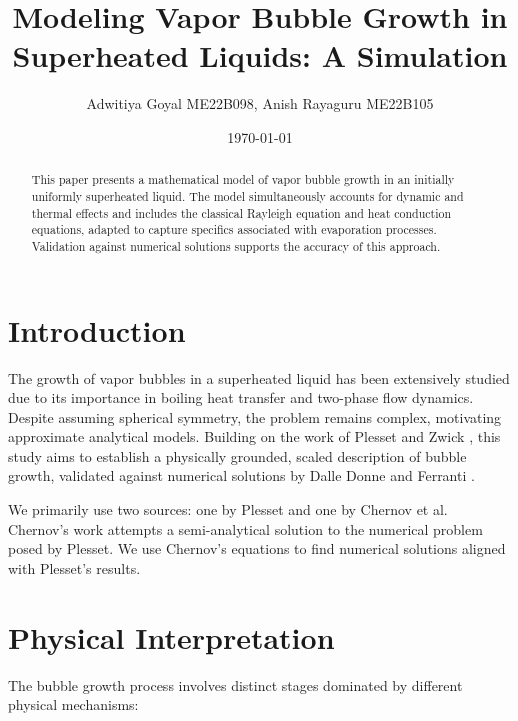 \documentclass[aps,pre,twocolumn,superscriptaddress,floatfix]{revtex4-2}
\begin{document}
\title{Modeling Vapor Bubble Growth in Superheated Liquids: A Simulation}

\author{Adwitiya Goyal ME22B098, Anish Rayaguru ME22B105}

\date{\today}

\begin{abstract}
This paper presents a mathematical model of vapor bubble growth in an initially uniformly superheated liquid. The model simultaneously accounts for dynamic and thermal effects and includes the classical Rayleigh equation and heat conduction equations, adapted to capture specifics associated with evaporation processes. Validation against numerical solutions supports the accuracy of this approach.
\end{abstract}

\maketitle

\section{Introduction}

The growth of vapor bubbles in a superheated liquid has been extensively studied due to its importance in boiling heat transfer and two-phase flow dynamics. Despite assuming spherical symmetry, the problem remains complex, motivating approximate analytical models. Building on the work of Plesset and Zwick \cite{plesset1954}, this study aims to establish a physically grounded, scaled description of bubble growth, validated against numerical solutions by Dalle Donne and Ferranti \cite{dalle1975}.

We primarily use two sources: one by Plesset and one by Chernov et al. Chernov's work attempts a semi-analytical solution to the numerical problem posed by Plesset. We use Chernov's equations to find numerical solutions aligned with Plesset's results.


\section{Physical Interpretation}

The bubble growth process involves distinct stages dominated by different physical mechanisms:
\end{document}
